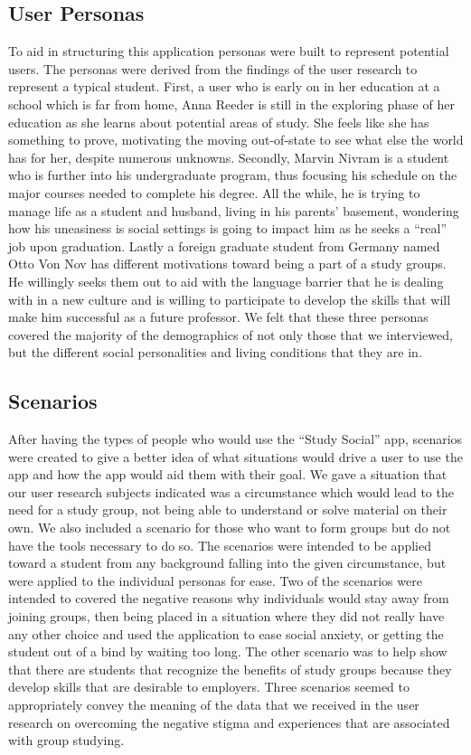 \documentclass{sigchi-ext}
\begin{document}
\subsection{User Personas}
To aid in structuring this application personas were built to represent
potential users. The personas were derived from the findings of the user
research to represent a typical student. First, a user who is early on in
her education at a school which is far from home, Anna Reeder is still in
the exploring phase of her education as she learns about potential areas of
study. She feels like she has something to prove, motivating the moving
out-of-state to see what else the world has for her, despite numerous
unknowns. Secondly, Marvin Nivram is a student who is further into his
undergraduate program, thus focusing his schedule on the major courses
needed to complete his degree. All the while, he is trying to manage life
as a student and husband, living in his parents' basement, wondering how
his uneasiness is social settings is going to impact him as he seeks a
“real” job upon graduation. Lastly a foreign graduate student from Germany
named Otto Von Nov has different motivations toward being a part of a study
groups. He willingly seeks them out to aid with the language barrier that
he is dealing with in a new culture and is willing to participate to
develop the skills that will make him successful as a future professor. We
felt that these three personas covered the majority of the demographics of
not only those that we interviewed, but the different social personalities
and living conditions that they are in.

\subsection{Scenarios}
After having the types of people who would use the ``Study Social'' app,
scenarios were created to give a better idea of what situations would drive
a user to use the app and how the app would aid them with their goal. We
gave a situation that our user research subjects indicated was a
circumstance which would lead to the need for a study group, not being able
to understand or solve material on their own. We also included a scenario
for those who want to form groups but do not have the tools necessary to do
so. The scenarios were intended to be applied toward a student from any
background falling into the given circumstance, but were applied to the
individual personas for ease. Two of the scenarios were intended to covered
the negative reasons why individuals would stay away from joining groups,
then being placed in a situation where they did not really have any other
choice and used the application to ease social anxiety, or getting the
student out of a bind by waiting too long. The other scenario was to help
show that there are students that recognize the benefits of study groups
because they develop skills that are desirable to employers. Three
scenarios seemed to appropriately convey the meaning of the data that we
received in the user research on overcoming the negative stigma and
experiences that are associated with group studying.
\end{document}
